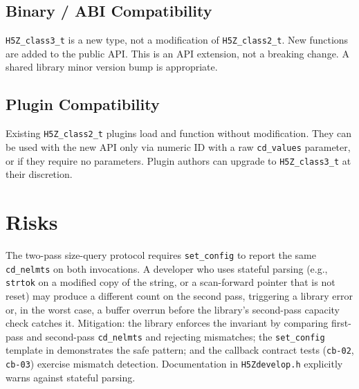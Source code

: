 \documentclass[../RFC-HDFG-2026-001.tex]{subfiles}
\begin{document}
\subsection{Binary / ABI Compatibility}

\texttt{H5Z\_class3\_t} is a new type, not a modification of \texttt{H5Z\_class2\_t}. New
functions are added to the public API. This is an API extension, not a
breaking change. A shared library minor version bump is appropriate.

\subsection{Plugin Compatibility}

Existing \texttt{H5Z\_class2\_t} plugins load and function without modification. They
can be used with the new API only via numeric ID with a raw \texttt{cd\_values}
parameter, or if they require no parameters. Plugin authors can upgrade to
\texttt{H5Z\_class3\_t} at their discretion.


\section{Risks}
\label{sec:risks}

The two-pass size-query protocol requires \texttt{set\_config} to report the
same \texttt{cd\_nelmts} on both invocations.  A developer who uses stateful
parsing (e.g., \texttt{strtok} on a modified copy of the string, or a
scan-forward pointer that is not reset) may produce a different count on the
second pass, triggering a library error or, in the worst case, a buffer
overrun before the library's second-pass capacity check catches it.
Mitigation: the library enforces the invariant by comparing first-pass and
second-pass \texttt{cd\_nelmts} and rejecting mismatches; the
\texttt{set\_config} template in 
demonstrates the safe pattern; and the callback contract tests
(\texttt{cb-02}, \texttt{cb-03}) exercise mismatch detection.  Documentation
in \texttt{H5Zdevelop.h} explicitly warns against stateful parsing.
\end{document}
